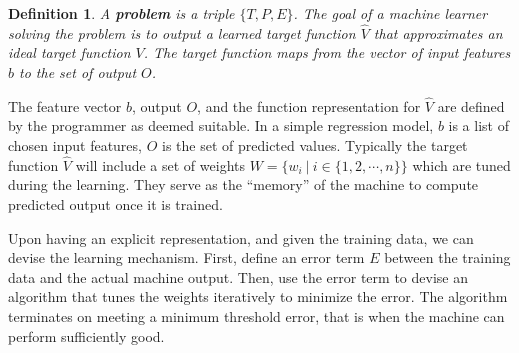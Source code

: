 \documentclass[12pt]{article}  %
\newtheorem{definition}{Definition}
\begin{document}
\begin{definition}
A {\bf \em problem} is a triple $\{T, P, E\}$. The goal of a machine learner solving the problem is to output a learned target function $\hat{V}$ that approximates an ideal target function $V$. The target function maps from the vector of input features $b$ to the set of output $O$.
\end{definition}

The feature vector $b$, output $O$, and the function representation for $\hat{V}$ are defined by the programmer as deemed suitable. In a simple regression model, $b$ is a list of chosen input features, $O$ is the set of predicted values. Typically the target function $\hat{V}$ will include a set of weights $W = \{w_i \ | \ i \in \{1,2,\cdots,n\}\}$ which are tuned during the learning. They serve as the ``memory'' of the machine to compute predicted output once it is trained.

Upon having an explicit representation, and given the training data, we can devise the learning mechanism. First, define an error term $E$ between the training data and the actual machine output. Then, use the error term to devise an algorithm that tunes the weights iteratively to minimize the error. The algorithm terminates on meeting a minimum threshold error, that is when the machine can perform sufficiently good.
\end{document}
